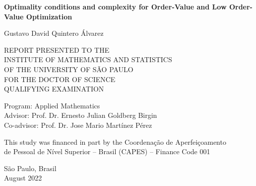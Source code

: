 \documentclass[11pt,oneside,a4paper]{book}
\newcommand{\autor}{Gustavo David Quintero Álvarez}
\newcommand{\titulo}{Optimality conditions and complexity for Order-Value and Low Order-Value Optimization}
\begin{document}
\fancyhead{} %
\rhead{\thepage} %
\lhead{} %

\pagestyle{fancy} %

\renewcommand{\backrefpagesname}{Cited in page(s):~}
\renewcommand{\backref}{}
\renewcommand*{\backrefalt}[4]{
	\ifcase #1 %
		No citations in the text.%
	\or
		Cited on page #2.%
	\else
		Cited #1 times on pages #2.%
	\fi}%

\begin{titlepage}
\begin{center}
\begin{minipage}[t][56mm][s]{96mm}
          \vspace*{2cm plus 1.5cm minus 1.8cm}

          \centering

          {\Large \bfseries\titulo}\\[0.4cm] %

          \vspace{1cm plus 1cm minus 0.6cm}

          {\Large\autor}

          \vspace*{2cm plus 1.5cm minus 1.8cm}
      \end{minipage}

\vfill
    \textsc{\large{
    REPORT PRESENTED TO THE\\
    INSTITUTE OF MATHEMATICS AND STATISTICS\\
    OF THE UNIVERSITY OF SÃO PAULO\\
    FOR THE DOCTOR OF SCIENCE\\
    QUALIFYING EXAMINATION}}
    
    \vskip 1.5cm
    \large{
    Program: Applied Mathematics\\
    Advisor: Prof. Dr. Ernesto Julian Goldberg Birgin\\
    Co-advisor: Prof. Dr. Jose Mario Martínez Pérez}

   	\vfill
    \normalsize{This study was financed in part by the Coordenação de
         Aperfeiçoamento\\ de Pessoal de Nível Superior -- Brasil
         (CAPES) -- Finance Code 001}
    
    \vskip 1.5cm
    \normalsize{São Paulo, Brasil}\\
    \normalsize{August 2022}
\end{center}
\end{titlepage}
\end{document}
